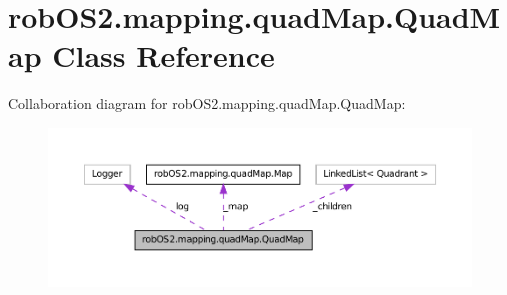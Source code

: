 \hypertarget{classrob_o_s2_1_1mapping_1_1quad_map_1_1_quad_map}{
\section{robOS2.mapping.quadMap.QuadMap Class Reference}
\label{classrob_o_s2_1_1mapping_1_1quad_map_1_1_quad_map}
}


Collaboration diagram for robOS2.mapping.quadMap.QuadMap:\nopagebreak
\begin{figure}[H]
\begin{center}
\leavevmode
\includegraphics[width=400pt]{classrob_o_s2_1_1mapping_1_1quad_map_1_1_quad_map__coll__graph}
\end{center}
\end{figure}

